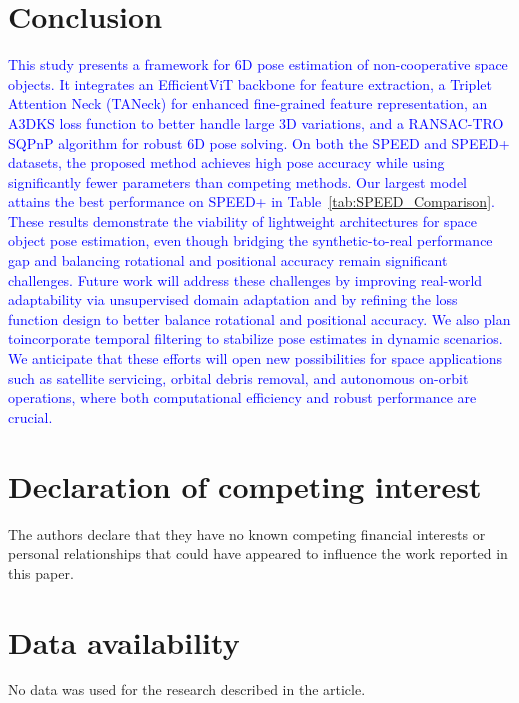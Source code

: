 \documentclass[a4paper,fleqn]{cas-sc}
\begin{document}
\section{Conclusion} \label{sec:conclusion}
\textcolor{blue}{
This study presents a framework for 6D pose estimation of non-cooperative space objects. It integrates an EfficientViT backbone for feature extraction, a Triplet Attention Neck (TANeck) for enhanced fine-grained feature representation, an A3DKS loss function to better handle large 3D variations, and a RANSAC-TRO SQPnP algorithm for robust 6D pose solving.
On both the SPEED and SPEED+ datasets, the proposed method achieves high pose accuracy while using significantly fewer parameters than competing methods. Our largest model attains the best performance on SPEED+ in Table~\ref{tab:SPEED_Comparison}. These results demonstrate the viability of lightweight architectures for space object pose estimation, even though bridging the synthetic-to-real performance gap and balancing rotational and positional accuracy remain significant challenges.
Future work will address these challenges by improving real-world adaptability via unsupervised domain adaptation and by refining the loss function design to better balance rotational and positional accuracy. We also plan toincorporate temporal filtering to stabilize pose estimates in dynamic scenarios. We anticipate that these efforts will open new possibilities for space applications such as satellite servicing, orbital debris removal, and autonomous on-orbit operations, where both computational efficiency and robust performance are crucial.
}
\section*{Declaration of competing interest}

The authors declare that they have no known competing financial interests or personal relationships that could have appeared to influence the work reported in this paper.

\section*{Data availability}

No data was used for the research described in the article. 

\printcredits




\end{document}
